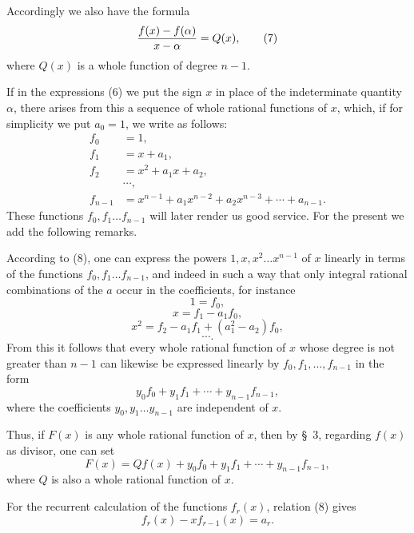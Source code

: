 \documentclass[11pt]{article}
\begin{document}
Accordingly we also have the formula
\begin{equation}
 {f(x)-f(\alpha)\over x-\alpha}=Q(x),
\tag{7}
\end{equation}
where $Q(x)$ is a whole function of degree $n-1$.

If in the expressions (6) we put the sign $x$ in place of the indeterminate quantity $\alpha$, there arises from this a sequence of whole rational functions of $x$, which, if for simplicity we put $a_0=1$, we write as follows:
\begin{equation}
\begin{aligned}
f_0&=1,\\
f_1&=x+a_1,\\
f_2&=x^2+a_1x+a_2,\\
&\cdots,\\
f_{n-1}&=x^{n-1}+a_1x^{n-2}+a_2x^{n-3}+\cdots+a_{n-1}.
\end{aligned}
\tag{8}
\end{equation}
These functions $f_0,f_1\ldots f_{n-1}$ will later render us good service. For the present we add the following remarks.

According to (8), one can express the powers $1,x,x^2\ldots x^{n-1}$ of $x$ linearly in terms of the functions $f_0,f_1\ldots f_{n-1}$, and indeed in such a way that only integral rational combinations of the $a$ occur in the coefficients, for instance
\[
 1=f_0,
\]
\[
 x=f_1-a_1f_0,
\]
\[
 x^2=f_2-a_1f_1+(a_1^2-a_2)f_0,
\]
\[
 \cdots.
\]
From this it follows that every whole rational function of $x$ whose degree is not greater than $n-1$ can likewise be expressed linearly by $f_0,f_1,\ldots,f_{n-1}$ in the form
\begin{equation}
 y_0f_0+y_1f_1+\cdots+y_{n-1}f_{n-1},
\tag{9}
\end{equation}
where the coefficients $y_0,y_1\ldots y_{n-1}$ are independent of $x$.

Thus, if $F(x)$ is any whole rational function of $x$, then by \S~3, regarding $f(x)$ as divisor, one can set
\begin{equation}
 F(x)=Qf(x)+y_0f_0+y_1f_1+\cdots+y_{n-1}f_{n-1},
\tag{10}
\end{equation}
where $Q$ is also a whole rational function of $x$.

For the recurrent calculation of the functions $f_r(x)$, relation (8) gives
\begin{equation}
 f_r(x)-xf_{r-1}(x)=a_r.
\tag{11}
\end{equation}
\end{document}
